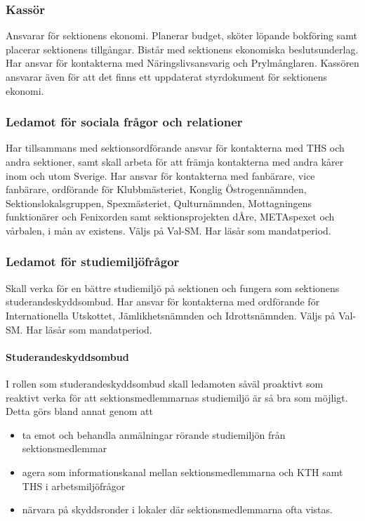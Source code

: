 \documentclass{dgovdoc}
\begin{document}
\subsubsection{Kassör}

Ansvarar för sektionens ekonomi. Planerar budget, sköter löpande bokföring samt placerar sektionens tillgångar. Bistår med sektionens ekonomiska beslutsunderlag. Har ansvar för kontakterna med Näringslivsansvarig och Prylmånglaren. Kassören ansvarar även för att det finns ett uppdaterat styrdokument för sektionens ekonomi.

\subsubsection{Ledamot för sociala frågor och relationer}

Har tillsammans med sektionsordförande ansvar för kontakterna med THS och andra sektioner, samt skall arbeta för att främja kontakterna med andra kårer inom och utom Sverige. Har ansvar för kontakterna med fanbärare, vice fanbärare, ordförande för Klubbmästeriet, Konglig Östrogennämnden, Sektionslokalsgruppen, Spexmästeriet, Qulturnämnden, Mottagningens funktionärer och Fenixorden samt sektionsprojekten dÅre, METAspexet och vårbalen, i mån av existens. Väljs på Val-SM. Har läsår som mandatperiod.

\subsubsection{Ledamot för studiemiljöfrågor}

Skall verka för en bättre studiemiljö på sektionen och fungera som sektionens
studerandeskyddsombud. Har ansvar för kontakterna med ordförande för Internationella Utskottet, Jämlikhetsnämnden och Idrottsnämnden. Väljs på Val-SM. Har läsår som mandatperiod.

\paragraph{Studerandeskyddsombud}

I rollen som studerandeskyddsombud skall ledamoten såväl proaktivt som reaktivt verka för att sektionsmedlemmarnas studiemiljö är så bra som möjligt. Detta görs bland annat genom att

\begin{itemize}
  \item ta emot och behandla anmälningar rörande studiemiljön från sektionsmedlemmar
  \item agera som informationskanal mellan sektionsmedlemmarna och KTH samt THS i arbetsmiljöfrågor
  \item närvara på skyddsronder i lokaler där sektionsmedlemmarna ofta vistas.
\end{itemize}
\end{document}

